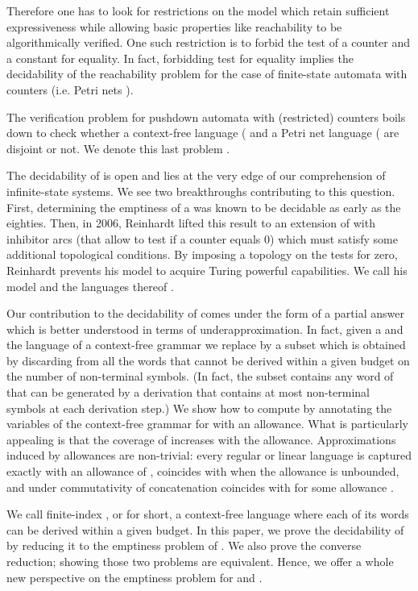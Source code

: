 \documentclass{fsttcs}
\begin{document}
Therefore one has to look for restrictions on the model which retain sufficient
expressiveness while allowing basic properties like reachability to be
algorithmically verified. One such restriction is to forbid the test of a
counter and a constant for equality.  In fact, forbidding test for equality
implies the decidability of the reachability problem  for the case of finite-state
automata with counters (i.e. Petri nets \cite{LEROUX-POPL2011,Reinhardt}). 

The verification problem  for pushdown automata with (restricted) counters
boils down to check whether a context-free language ( and a Petri net
language ( are disjoint or not. We denote this last problem
. 
 





The decidability of  is open and lies at the very edge of our
comprehension of infinite-state systems.  We see two breakthroughs contributing
to this question.  First, determining the emptiness of a  was known to
be decidable as early as the eighties. Then, in 2006, Reinhardt
\cite{Reinhardt} lifted this result to an extension of  with inhibitor
arcs (that allow to test if a counter equals 0) {which must satisfy some
additional topological conditions. By imposing a topology on the tests for
zero,} Reinhardt prevents his model to acquire Turing powerful capabilities. We
call his model  and the languages thereof .



Our contribution to the decidability of  comes under the form
of a partial answer which is better understood in terms of underapproximation.
In fact, given a   and the language  of a context-free
grammar we replace  by a subset  which is obtained by discarding
from  all the words that cannot be derived within a given budget  on the
number of non-terminal symbols. (In fact, the subset   contains any word of  that can be generated  by a  derivation  that  contains at most  non-terminal symbols at each derivation step.)  We show how to compute  by annotating the
variables of the context-free grammar for  with an allowance. What is
particularly appealing is that the coverage of  increases with the allowance.
{Approximations induced by allowances are non-trivial: every regular or
linear language is captured exactly with an allowance of ,  coincides with 
when the allowance is unbounded, and under commutativity of concatenation
 coincides with  for some allowance
.}

We call finite-index , or  for short, a context-free
language where each of its words can be derived within a given budget.  In this
paper, we prove the decidability of
 by reducing it to the
emptiness problem of . We also prove the converse reduction; showing
those two problems are equivalent. Hence, we offer a whole new perspective on
the emptiness problem for  and .  
\end{document}
